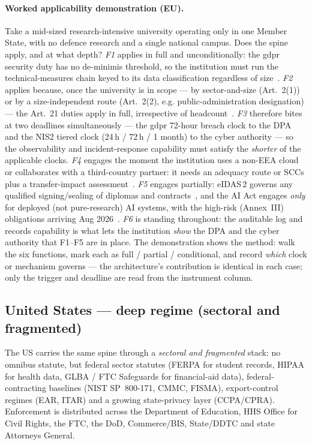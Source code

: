 \paragraph{Worked applicability demonstration (EU).} Take a
mid-sized research-intensive university operating only in one Member
State, with no defence research and a single national campus. Does the
spine apply, and at what depth? \emph{F1} applies in full and
unconditionally: the \gls{gdpr} security duty has no de-minimis
threshold, so the institution must run the technical-measures chain
keyed to its data classification regardless of size~\cite{gdpr}.
\emph{F2} applies because, once the university is in scope --- by
sector-and-size (Art.~2(1)) or by a size-independent route
(Art.~2(2), e.g. public-administration designation) --- the Art.~21
duties apply in full, irrespective of headcount~\cite{nis2}.
\emph{F3} therefore bites at two deadlines simultaneously --- the
\gls{gdpr} 72-hour breach clock to the DPA and the NIS2 tiered clock
(24\,h / 72\,h / 1 month) to the cyber authority --- so the
observability and incident-response capability must satisfy the
\emph{shorter} of the applicable clocks. \emph{F4} engages the moment
the institution uses a non-EEA cloud or collaborates with a
third-country partner: it needs an adequacy route or SCCs plus a
transfer-impact assessment~\cite{eu-sccs2021,eu-dpf-adequacy-2023}.
\emph{F5} engages partially: eIDAS\,2 governs any qualified
signing/sealing of diplomas and contracts~\cite{eidas2-2024}, and the
AI Act engages \emph{only} for deployed (not pure-research) AI
systems, with the high-risk (Annex~III) obligations arriving Aug
2026~\cite{eu-ai-act}. \emph{F6} is standing throughout: the auditable
log and records capability is what lets the institution \emph{show} the
DPA and the cyber authority that F1--F5 are in place. The
demonstration shows the method: walk the six functions, mark each as
full / partial / conditional, and record \emph{which} clock or
mechanism governs --- the architecture's contribution is identical in
each case; only the trigger and deadline are read from the instrument
column.

\subsection{United States --- deep regime (sectoral and fragmented)}
\label{sec:reg-us}

The US carries the same spine through a \emph{sectoral and fragmented}
stack: no omnibus statute, but federal sector statutes (FERPA for
student records, HIPAA for health data, GLBA / FTC Safeguards for
financial-aid data), federal-contracting baselines (NIST
SP~800-171, CMMC, FISMA), export-control regimes (EAR, ITAR) and a
growing state-privacy layer (CCPA/CPRA). Enforcement is distributed
across the Department of Education, HHS Office for Civil Rights, the
FTC, the DoD, Commerce/BIS, State/DDTC and state Attorneys General.

